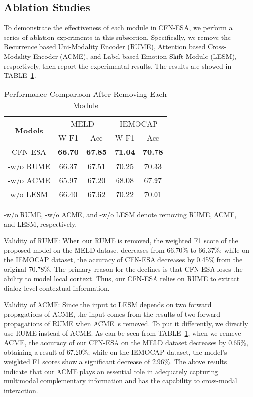 \documentclass[journal]{IEEEtran}
\begin{document}
\subsection{Ablation Studies}
To demonstrate the effectiveness of each module in CFN-ESA, we perform a series of ablation experiments in this subsection. Specifically, we remove the Recurrence based Uni-Modality Encoder (RUME), Attention based Cross-Modality Encoder (ACME), and Label based Emotion-Shift Module (LESM), respectively, then report the experimental results. The results are showed in TABLE~\ref{tab:ablation}.
\begin{table}[htbp]
    \centering
    \renewcommand{\arraystretch}{1.0}
    \setlength{\tabcolsep}{10pt}
    \caption{Performance Comparison After Removing Each Module}
    \begin{threeparttable}
    \begin{tabular}{c|cc|cc}
    \hline
    \multirow{2}{*}{\textbf{Models}} &\multicolumn{2}{c|}{MELD} &\multicolumn{2}{c}{IEMOCAP}\\
&W-F1 &Acc &W-F1 &Acc\\ 
    \hline 
	CFN-ESA &\textbf{66.70} &\textbf{67.85} &\textbf{71.04} &\textbf{70.78} \\
	\hline
	-w/o RUME &66.37 &67.51 &70.25 &70.33 \\
    -w/o ACME &65.97 &67.20 &68.08 &67.97 \\
	w/o LESM &66.40 &67.62 &70.22 &70.01 \\
	\hline
    \end{tabular}
    \begin{tablenotes}
        \footnotesize
        \item -w/o RUME, -w/o ACME, and -w/o LESM denote removing RUME, ACME, and LESM, respectively.
    \end{tablenotes}
    \end{threeparttable}
    \label{tab:ablation}
\end{table}

Validity of RUME: When our RUME is removed, the weighted F1 score of the proposed model on the MELD dataset decreases from 66.70\% to 66.37\%; while on the IEMOCAP dataset, the accuracy of CFN-ESA decreases by 0.45\% from the original 70.78\%. The primary reason for the declines is that CFN-ESA loses the ability to model local context. Thus, our CFN-ESA relies on RUME to extract dialog-level contextual information.

Validity of ACME: Since the input to LESM depends on two forward propagations of ACME, the input comes from the results of two forward propagations of RUME when ACME is removed. To put it differently, we directly use RUME instead of ACME. As can be seen from TABLE~\ref{tab:ablation}, when we remove ACME, the accuracy of our CFN-ESA on the MELD dataset decreases by 0.65\%, obtaining a result of 67.20\%; while on the IEMOCAP dataset, the model's weighted F1 scores show a significant decrease of 2.96\%. The above results indicate that our ACME plays an essential role in adequately capturing multimodal complementary information and has the capability to cross-modal interaction.
\end{document}
